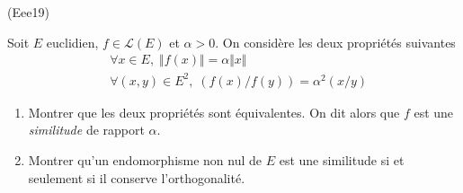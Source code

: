 \begin{tiny}(Eee19)\end{tiny} Soit $E$ euclidien, $f\in \mathcal{L}(E)$ et $\alpha >0$. On considère les deux propriétés suivantes
\begin{align*}
 &\forall x\in E,\; \Vert f(x)\Vert = \alpha \Vert x \Vert\\
 &\forall (x,y)\in E^2,\; (f(x)/f(y)) = \alpha^2 (x/y)
\end{align*}
\begin{enumerate}
 \item Montrer que les deux propriétés sont équivalentes. On dit alors que $f$ est une \emph{similitude} de rapport $\alpha$.
 \item Montrer qu'un endomorphisme non nul de $E$ est une similitude si et seulement si il conserve l'orthogonalité.
\end{enumerate}
